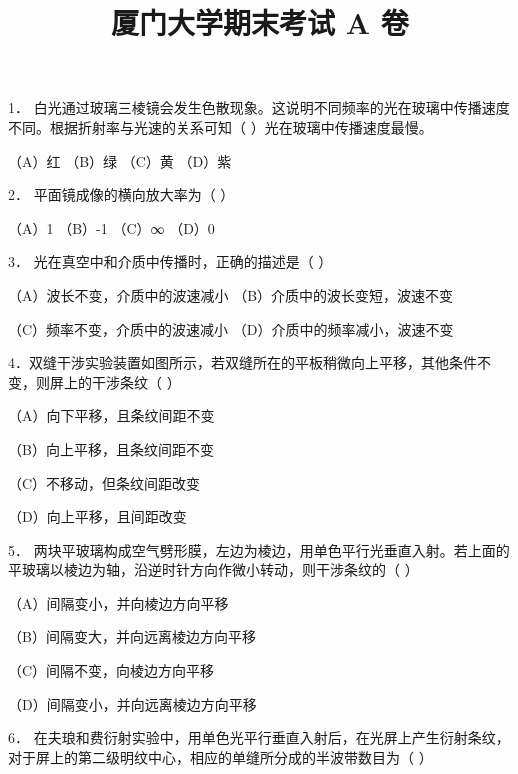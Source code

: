 \documentclass[fontset=exam]{exam-zh}
\title{厦门大学期末考试 A 卷}
\begin{document}
\maketitle
{}
\noindent{}\par
{}

\par{}\smallskip

1． 白光通过玻璃三棱镜会发生色散现象。这说明不同频率的光在玻璃中传播速度不同。根据折射率与光速的关系可知（ ）光在玻璃中传播速度最慢。

（A）红 （B）绿 （C）黄 （D）紫

2． 平面镜成像的横向放大率为（ ）

（A）1 （B）-1 （C）∞ （D）0

3． 光在真空中和介质中传播时，正确的描述是（ ）

（A）波长不变，介质中的波速减小 （B）介质中的波长变短，波速不变

（C）频率不变，介质中的波速减小 （D）介质中的频率减小，波速不变

4．双缝干涉实验装置如图所示，若双缝所在的平板稍微向上平移，其他条件不变，则屏上的干涉条纹（ ）

（A）向下平移，且条纹间距不变

（B）向上平移，且条纹间距不变

（C）不移动，但条纹间距改变

（D）向上平移，且间距改变

5． 两块平玻璃构成空气劈形膜，左边为棱边，用单色平行光垂直入射。若上面的平玻璃以棱边为轴，沿逆时针方向作微小转动，则干涉条纹的（ ）

（A）间隔变小，并向棱边方向平移

（B）间隔变大，并向远离棱边方向平移

（C）间隔不变，向棱边方向平移

（D）间隔变小，并向远离棱边方向平移

6． 在夫琅和费衍射实验中，用单色光平行垂直入射后，在光屏上产生衍射条纹，对于屏上的第二级明纹中心，相应的单缝所分成的半波带数目为（ ）
\end{document}
